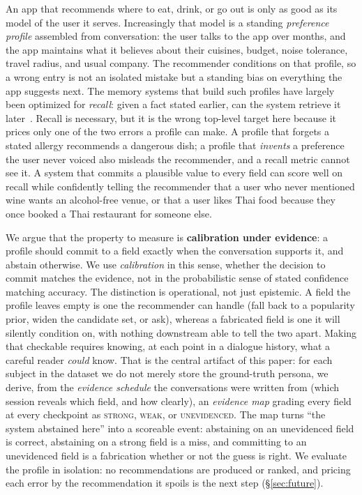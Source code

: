 \documentclass{article}
\begin{document}
An app that recommends where to eat, drink, or go out is only as good as its model of the user it
serves. Increasingly that model is a standing \emph{preference profile} assembled from
conversation: the user talks to the app over months, and the app maintains what it believes about
their cuisines, budget, noise tolerance, travel radius, and usual company. The recommender conditions
on that profile, so a wrong entry is not an isolated mistake but a standing bias on everything the app
suggests next. The memory systems that build such profiles have largely been optimized for
\emph{recall}: given a fact stated earlier, can the system retrieve it later~\citep{packer2023memgpt,
zhong2024memorybank, chhikara2025mem0}. Recall is necessary, but it is the wrong
top-level target here because it prices only one of the two errors a profile can make. A profile that
forgets a stated allergy recommends a dangerous dish; a profile that \emph{invents} a preference the
user never voiced also misleads the recommender, and a recall metric cannot see it. A system that
commits a plausible value to every field can score well on recall while confidently telling the
recommender that a user who never mentioned wine wants an alcohol-free venue, or that a user likes
Thai food because they once booked a Thai restaurant for someone else.

We argue that the property to measure is \textbf{calibration under evidence}: a profile should commit
to a field exactly when the conversation supports it, and abstain otherwise. We use
\emph{calibration} in this sense, whether the decision to commit matches the evidence, not in the
probabilistic sense of stated confidence matching accuracy. The distinction is
operational, not just epistemic. A field the profile leaves empty is one the recommender can handle
(fall back to a popularity prior, widen the candidate set, or ask), whereas a fabricated field is
one it will silently condition on, with nothing downstream able to tell the two apart. Making that
checkable requires knowing, at each point in a dialogue history, what a careful reader \emph{could}
know. That is the central artifact of this paper: for each subject in the dataset we do not merely store
the ground-truth persona, we derive, from the \emph{evidence schedule} the conversations were written
from (which session reveals which field, and how clearly), an \emph{evidence map} grading every field at every checkpoint as \textsc{strong}, \textsc{weak}, or
\textsc{unevidenced}. The map turns ``the system abstained here'' into a scoreable event: abstaining
on an unevidenced field is correct, abstaining on a strong field is a miss, and committing to an
unevidenced field is a fabrication whether or not the guess is right. We evaluate the profile in isolation: no recommendations are
produced or ranked, and pricing each error by the recommendation it spoils is the next step
(\S\ref{sec:future}).
\end{document}
